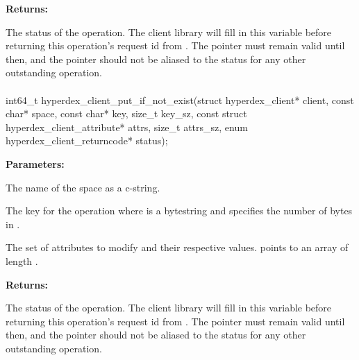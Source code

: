 \noindent\textbf{Returns:}
\begin{description}[labelindent=\widthof{{\code{status}}},leftmargin=*,noitemsep,nolistsep,align=right]
\item[\code{status}] The status of the operation.  The client library will fill in this variable before returning this operation's request id from .  The pointer must remain valid until then, and the pointer should not be aliased to the status for any other outstanding operation.
\end{description}

\paragraph{}
\label{api:c:put_if_not_exist}
\begin{ccode}
int64_t hyperdex_client_put_if_not_exist(struct hyperdex_client* client,
                const char* space,
                const char* key, size_t key_sz,
                const struct hyperdex_client_attribute* attrs, size_t attrs_sz,
                enum hyperdex_client_returncode* status);
\end{ccode}
\funcdesc 

\noindent\textbf{Parameters:}
\begin{description}[labelindent=\widthof{{\code{attrs}, \code{attrs\_sz}}},leftmargin=*,noitemsep,nolistsep,align=right]
\item[\code{space}] The name of the space as a c-string.
\item[\code{key}, \code{key\_sz}] The key for the operation where  is a bytestring and  specifies the number of bytes in .
\item[\code{attrs}, \code{attrs\_sz}] The set of attributes to modify and their respective values.   points to an array of length .
\end{description}

\noindent\textbf{Returns:}
\begin{description}[labelindent=\widthof{{\code{status}}},leftmargin=*,noitemsep,nolistsep,align=right]
\item[\code{status}] The status of the operation.  The client library will fill in this variable before returning this operation's request id from .  The pointer must remain valid until then, and the pointer should not be aliased to the status for any other outstanding operation.
\end{description}

